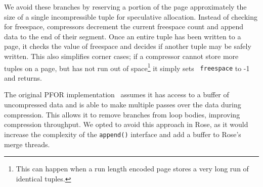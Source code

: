 \documentclass{vldb}
\newcommand{\rows}{Rose\xspace}
\newcommand{\rowss}{Rose's\xspace}
\begin{document}
We avoid these branches by reserving a portion of the page approximately the
size of a single incompressible tuple for speculative allocation.
Instead of checking for freespace, compressors decrement the current
freespace count and append data to the end of their segment.
Once an entire tuple has been written to a page,
it checks the value of freespace and decides if another tuple may be
safely written.  This also simplifies corner cases; if a
compressor cannot store more tuples on a page, but has not run out of
space\footnote{This can happen when a run length encoded page stores a
  very long run of identical tuples.} it simply sets {\tt
  freespace} to -1 and returns.



The original PFOR implementation~\cite{pfor} assumes it has access to
a buffer of uncompressed data and is able to make multiple
passes over the data during compression.  This allows it to remove
branches from loop bodies, improving compression throughput.  We opted
to avoid this approach in \rows, as it would increase the complexity
of the {\tt append()} interface and add a buffer to \rowss merge threads.


\end{document}
